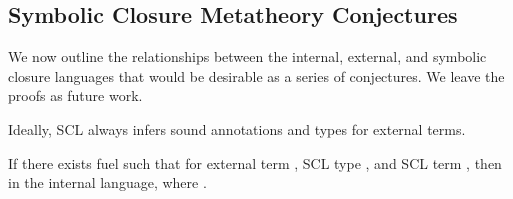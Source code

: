 \subsection{Symbolic Closure Metatheory Conjectures}

We now outline the relationships between the internal, external, and symbolic closure
languages that would be desirable as a series of conjectures.
We leave the proofs as future work.




Ideally, SCL always infers sound annotations and types for external terms.

\begin{conjecture}
  If there exists fuel {\ltiFuel{}} such that
     \ltitSstkjudgement{\ltimakeCombinedThreadedEnv{\ltiFuel{}}{\ltiEmptyClosureCache}}
                       {\ltiEmptyEnv}
                       {\ltiE{}}
                       {\ltiT{}}
                       {\ltimakeCombinedThreadedEnv{\ltiFuelp{}}{\ltiClosureCache{}}}
                       {\ltiEp{}}
  for external term \ltiE{},
                       SCL type \ltiT{},
                       and SCL term \ltiEp{},
                      then
    \ltitjudgementNoElab{}
                  {\ltielimClosLHS{\ltiClosureCache{}}{\ltiEp{}}}
                  {\ltiTp{}}
                   in the internal language,
                  where 
                  \ltiisubtype{}{\ltiTp{}}{\ltielimClosTLHS{\varnothing}{\ltiClosureCache{}}{\ltiTp{}}}.
\end{conjecture}

